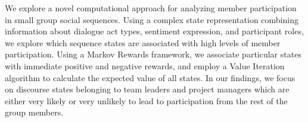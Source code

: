 We explore a novel computational approach for analyzing member participation in small group social sequences. Using a complex state representation combining information about dialogue act types, sentiment expression, and participant roles, we explore which sequence states are associated with high levels of member participation. Using a Markov Rewards framework, we associate particular states with immediate positive and negative rewards, and employ a Value Iteration algorithm to calculate the expected value of all states. In our findings, we focus on discourse states belonging to team leaders and project managers which are either very likely or very unlikely to lead to participation from the rest of the group members.
